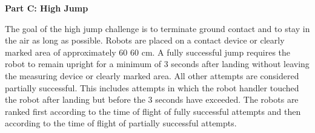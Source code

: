 \clearpage
\sffamily
{\bfseries \color[rgb]{0.4,0.4,0.4} Part C: High Jump}
{}


\bigskip

The goal of the high jump challenge is to terminate ground contact and to stay
in the air as long as possible.
Robots are placed on a contact device or clearly marked area of approximately 60 {\texttimes} 60 cm.
A fully successful jump requires the robot to remain upright for a minimum of 3
seconds after landing without leaving the measuring device or clearly marked area.
All other attempts are considered partially successful.
This includes attempts in which the robot handler touched the robot after landing
but before the 3 seconds have exceeded.
The robots are ranked first according to the time of flight of fully successful
attempts and then according to the time of flight of partially successful attempts.
